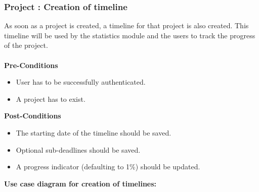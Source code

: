 \subsubsection{Project : Creation of timeline}
	As soon as a project is created, a timeline for that project is also created. This timeline will be used by the statistics module and the users to track the progress of the project.\\ \\
\textbf{Pre-Conditions}
\begin{itemize}
	\item User has to be successfully authenticated.
	\item A project has to exist. \\
\end{itemize}
\textbf{Post-Conditions}
\begin{itemize}
	\item The starting date of the timeline should be saved.
	\item Optional sub-deadlines should be saved.
	\item A progress indicator (defaulting to 1\%) should be updated.\\
\end{itemize}
\textbf{Use case diagram for creation of timelines: }\\
\centerline{}	
	
